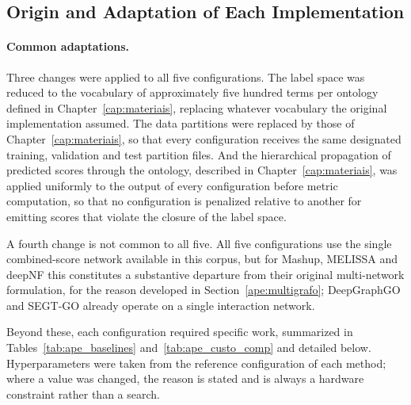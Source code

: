 \documentclass[Ingles]{ic-tese-v3}
\begin{document}
\begin{appendices}{}
\section{Origin and Adaptation of Each Implementation}
\label{ape:origem}

\paragraph{Common adaptations.} Three changes were applied to all five configurations. The label
space was reduced to the vocabulary of approximately five hundred terms per ontology defined in
Chapter~\ref{cap:materiais}, replacing whatever vocabulary the original implementation assumed. The
data partitions were replaced by those of Chapter~\ref{cap:materiais}, so that every configuration
receives the same designated training, validation and test partition files. And the hierarchical
propagation of predicted scores through the ontology, described in Chapter~\ref{cap:materiais}, was
applied uniformly to the output of every configuration before metric computation, so that no
configuration is penalized relative to another for emitting scores that violate the closure of the
label space.

A fourth change is not common to all five. All five configurations use the single combined-score
network available in this corpus, but for Mashup, MELISSA and deepNF this constitutes a substantive
departure from their original multi-network formulation, for the reason developed in
Section~\ref{ape:multigrafo}; DeepGraphGO and SEGT-GO already operate on a single interaction
network.

Beyond these, each configuration required specific work, summarized in
Tables~\ref{tab:ape_baselines} and~\ref{tab:ape_custo_comp} and detailed below. Hyperparameters were
taken from the reference configuration of each method; where a value was changed, the reason is
stated and is always a hardware constraint rather than a search.


\end{appendices}
\end{document}
